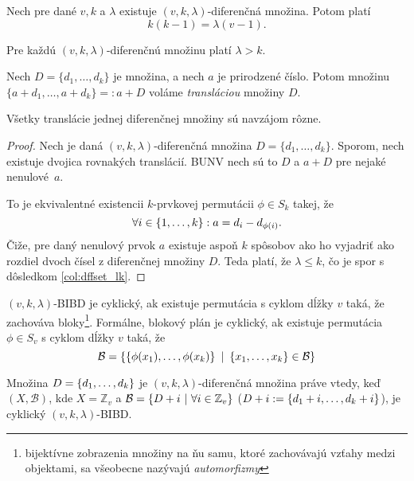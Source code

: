 \begin{toreview}
\begin{lemma}
\label{lem:dffset_counts}
Nech pre dané $v, k$ a $\lambda$ existuje $(v,k,\lambda)$-diferenčná množina. Potom platí $$k(k-1) = \lambda(v-1).$$
\end{lemma}

\begin{corollary}
\label{col:dffset_lk}
Pre každú $(v,k,\lambda)$-diferenčnú množinu platí $\lambda > k$.
\end{corollary}

\begin{definition}
Nech $D = \{d_1, \ldots, d_k\}$ je množina, a nech $a$ je prirodzené číslo. Potom množinu $\{a + d_1, \ldots, a + d_k\} =: a + D$ voláme \emph{transláciou} množiny $D$.
\end{definition}

\begin{lemma}
Všetky translácie jednej diferenčnej množiny sú navzájom rôzne. 
\end{lemma}
\begin{proof}
Nech je daná $(v,k,\lambda)$-diferenčná množina $D = \{d_1, \ldots, d_k\}$.
Sporom, nech existuje dvojica rovnakých translácií. 
BUNV nech sú to $D$ a $a + D$ pre nejaké nenulové~$a$.

To je ekvivalentné existencii $k$-prvkovej permutácii $\phi \in S_k$ takej, že $$\forall i \in \left\{1, \ldots, k\right\}: a = d_i - d_{\phi(i)}.$$
Čiže, pre daný nenulový prvok $a$ existuje aspoň $k$ spôsobov ako ho vyjadriť ako rozdiel dvoch čísel z diferenčnej množiny $D$. Teda platí, že $\lambda \leq k$, čo je spor s dôsledkom \ref{col:dffset_lk}.
\end{proof}

\end{toreview}


\begin{definition}
\label{def:cyclic_bibd}
$(v, k, \lambda)$-BIBD je cyklický, ak existuje permutácia s cyklom dĺžky $v$ taká, že zachováva bloky\footnote{
bijektívne zobrazenia množiny na ňu samu, ktoré zachovávajú vzťahy medzi objektami, sa všeobecne nazývajú \emph{automorfizmy}}. 
Formálne, blokový plán je cyklický, ak 
existuje permutácia  $\phi \in S_v$ s cyklom dĺžky $v$ taká, že 
$$\mathcal{B} = \left\{\left\{\phi(x_1), \ldots, \phi(x_k)\right\} ~|~ \left\{x_1, \ldots, x_k\right\} \in \mathcal{B} \right\}$$
\end{definition}

\begin{theorem}
\label{th:ds_bibd}
Množina $D = \left\{d_1, \ldots, d_k\right\}$ je $(v, k, \lambda)$-diferenčná množina práve vtedy, keď $(X, \mathcal{B})$, kde $X = \mathbb{Z}_v$ a $\mathcal{B} = \left\{D + i ~|~ \forall i \in \mathbb{Z}_v\right\}$ ($D + i := \left\{d_1 + i, \ldots, d_k + i\right\}$), je cyklický $(v, k, \lambda)$-BIBD. 
\end{theorem}

